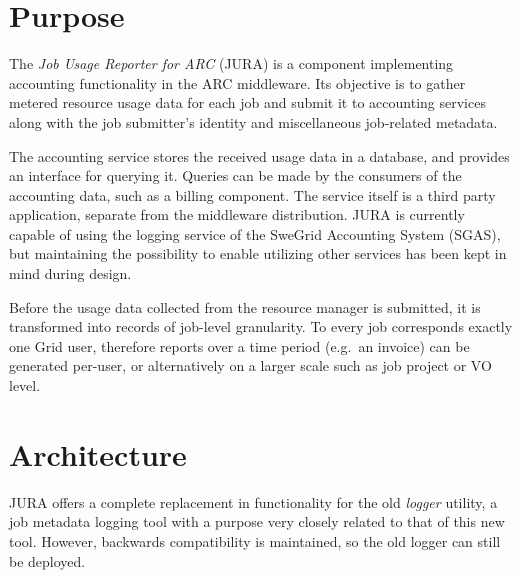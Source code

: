 \documentclass{article}                            %
\begin{document}
\newpage

\section{Purpose}

The \textit{Job Usage Reporter for ARC} (JURA) is a component
implementing accounting functionality in the ARC middleware. Its
objective is to gather metered resource usage data for each job and
submit it to accounting services along with the job submitter's
identity and miscellaneous job-related metadata.

The accounting service stores the received usage data in a database,
and provides an interface for querying it. Queries can be made by the
consumers of the accounting data, such as a billing component. The
service itself is a third party application, separate from the
middleware distribution. JURA is currently capable of using the
logging service of the SweGrid Accounting System (SGAS)\cite{sgas},
but maintaining the possibility to enable utilizing other services has
been kept in mind during design.

Before the usage data collected from the resource manager is
submitted, it is transformed into records of job-level granularity. To
every job corresponds exactly one Grid user, therefore reports over a
time period (e.g.~an invoice) can be generated per-user, or
alternatively on a larger scale such as job project or VO level.

\section{Architecture}

\begin{figure}[ht]
\end{figure}

JURA offers a complete replacement in functionality for the old
\textit{logger} utility\cite{logger}, a job metadata logging tool with
a purpose very closely related to that of this new tool. However,
backwards compatibility is maintained, so the old logger can still be
deployed.
\end{document}

